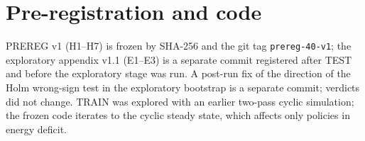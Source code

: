 \documentclass[10pt]{article}
\begin{document}
\section{Pre-registration and code}
PREREG v1 (H1--H7) is frozen by SHA-256 and the git tag \texttt{prereg-40-v1}; the exploratory appendix v1.1 (E1--E3) is a separate commit registered after TEST and before the exploratory stage was run. A post-run fix of the direction of the Holm wrong-sign test in the exploratory bootstrap is a separate commit; verdicts did not change. TRAIN was explored with an earlier two-pass cyclic simulation; the frozen code iterates to the cyclic steady state, which affects only policies in energy deficit.
\end{document}
